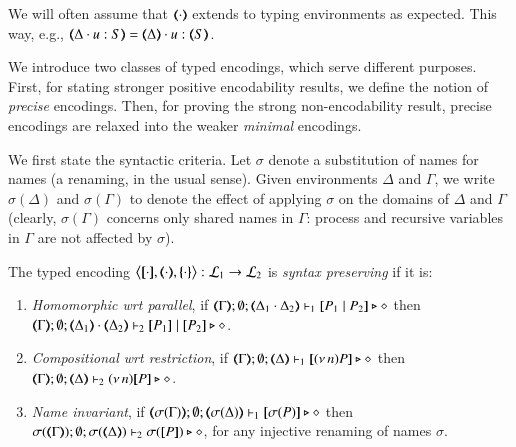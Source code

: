 \smallskip 

\noi We will often assume that  $(\!\!\langle\cdot\rangle\!\!)$ extends to typing
environments as expected. This way, e.g., $\mapt{\Delta \cat u:S} = \mapt{\Delta} \cat u:\mapt{S}$.

We introduce two classes of typed encodings, which 
serve different purposes. 
First, for stating stronger positive encodability results, %
we define the notion of {\em precise} encodings.
Then, 
for proving the strong non-encodability result, %
precise encodings are relaxed into the weaker {\em minimal} encodings. 

We first state the 
syntactic criteria. 
Let $\sigma$ denote a substitution of names for names (a renaming, in the usual sense). Given environments $\Delta$ and $\Gamma$,
we write $\sigma(\Delta)$ and $\sigma(\Gamma)$ to denote the effect of applying $\sigma$ on the 
domains of $\Delta$ and $\Gamma$
(clearly, $\sigma(\Gamma)$ concerns only shared names in $\Gamma$: process and recursive variables in $\Gamma$ are not affected by $\sigma$). 

\smallskip 

\begin{definition}\rm
	\label{def:sep}
	The typed encoding 
	$\enco{\map{\cdot}, \mapt{\cdot}, \mapa{\cdot}}: \tyl{L}_1 \to \tyl{L}_2$ is \emph{syntax preserving}
	if it is:
	
	\begin{enumerate}[1.]
		\item	\emph{Homomorphic wrt parallel},   if 
		$\mapt{\Gamma}; \emptyset; \mapt{\Delta_1 \cat \Delta_2} \proves_1 \map{P_1 \Par P_2} \hastype \Proc$
		then 
		$\mapt{\Gamma}; \emptyset; \mapt{\Delta_1} \cat \mapt{\Delta_2} \proves_2 \map{P_1} \Par \map{P_2} \hastype \Proc$.

		\item	\emph{Compositional wrt restriction},  if 
		$\mapt{\Gamma}; \emptyset; \mapt{\Delta} \proves_1 \map{\news{n}P} \hastype \Proc$
		then 
		$\mapt{\Gamma}; \emptyset; \mapt{\Delta} \proves_2 \news{n}\map{P} \hastype \Proc$.
		
		\item \emph{Name invariant},   if
		$\mapt{\sigma(\Gamma)}; \emptyset; \mapt{\sigma(\Delta)} \proves_1 \map{\sigma(P)} \hastype \Proc$
		then \\
		$\sigma(\mapt{\Gamma}); \emptyset; \sigma(\mapt{\Delta}) \proves_2 \sigma(\map{P}) \hastype \Proc$, 
		for any injective renaming  of names $\sigma$.
	\end{enumerate}
\end{definition}

